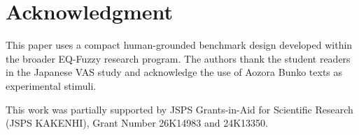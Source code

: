 \section*{Acknowledgment}
This paper uses a compact human-grounded benchmark design developed within the broader EQ-Fuzzy research program. The authors thank the student readers in the Japanese VAS study and acknowledge the use of Aozora Bunko texts as experimental stimuli.

This work was partially supported by JSPS Grants-in-Aid for Scientific Research (JSPS KAKENHI), Grant Number 26K14983 and 24K13350.
